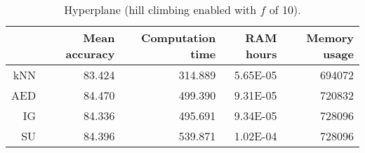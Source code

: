 \begin{table}[h]
\centering
\begin{tabular}{r|rrrr}
    & Mean accuracy & Computation time & RAM hours & Memory usage \\ \hline
kNN & 83.424                   & 314.889          & 5.65E-05  & 694072       \\
AED & 84.470                   & 499.390          & 9.31E-05  & 720832       \\
IG  & 84.336                   & 495.691          & 9.34E-05  & 728096       \\
SU  & 84.396                   & 539.871          & 1.02E-04  & 728096      
\end{tabular}
\caption{Hyperplane (hill climbing enabled with $f$ of 10).}
\label{Table:Hyperplane_H}
\end{table}